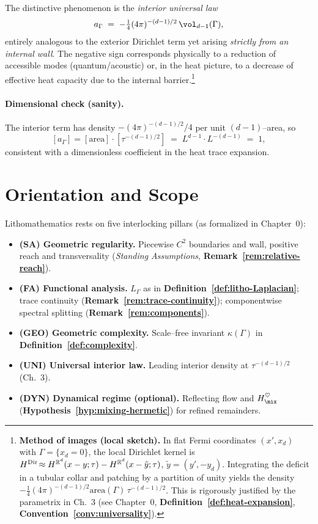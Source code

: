 \noindent The distinctive phenomenon is the \emph{interior universal law}
\[
a_\Gamma \;=\; -\tfrac14(4\pi)^{-(d-1)/2}\,\vol_{d-1}(\Gamma),
\]
entirely analogous to the exterior Dirichlet term yet arising \emph{strictly from an internal wall}.
The negative sign corresponds physically to a reduction of accessible modes (quantum/acoustic) or, in the heat picture, to a decrease of effective heat capacity due to the internal barrier.\footnote{\textbf{Method of images (local sketch).}
In flat Fermi coordinates $(x',x_d)$ with $\Gamma=\{x_d=0\}$, the local Dirichlet kernel is
$H^{\rm Dir}\!\approx H^{\mathbb{R}^d}(x-y;\tau)-H^{\mathbb{R}^d}(x-\tilde y;\tau)$, $\tilde y=(y',-y_d)$.
Integrating the deficit in a tubular collar and patching by a partition of unity yields the density $-\frac14(4\pi)^{-(d-1)/2}\mathrm{area}(\Gamma)\,\tau^{-(d-1)/2}$.
This is rigorously justified by the parametrix in Ch.~3 (see Chapter~0, \textbf{Definition~\ref{def:heat-expansion}}, \textbf{Convention~\ref{conv:universality}}).}

\paragraph{Dimensional check (sanity).}
The interior term has density $-(4\pi)^{-(d-1)/2}/4$ per unit $(d\!-\!1)$–area, so
\[
[a_\Gamma]=[\mathrm{area}]\cdot[\tau^{-(d-1)/2}] \;=\; L^{d-1}\cdot L^{-(d-1)} \;=\; 1,
\]
consistent with a dimensionless coefficient in the heat trace expansion.

\medskip

\section{Orientation and Scope}\label{sec:orientation}

Lithomathematics rests on five interlocking pillars (as formalized in Chapter~0):

\begin{itemize}
  \item \textbf{(SA) Geometric regularity.} Piecewise $C^2$ boundaries and wall, positive reach and transversality (\emph{Standing Assumptions}, \textbf{Remark~\ref{rem:relative-reach}}).
  \item \textbf{(FA) Functional analysis.} $L_\Gamma$ as in \textbf{Definition~\ref{def:litho-Laplacian}}; trace continuity (\textbf{Remark~\ref{rem:trace-continuity}}); componentwise spectral splitting (\textbf{Remark~\ref{rem:components}}).
  \item \textbf{(GEO) Geometric complexity.} Scale–free invariant $\kappa(\Gamma)$ in \textbf{Definition~\ref{def:complexity}}.
  \item \textbf{(UNI) Universal interior law.} Leading interior density at $\tau^{-(d-1)/2}$ (Ch.~3).
  \item \textbf{(DYN) Dynamical regime (optional).} Reflecting flow and $H_{\mix}^{\heartsuit}$ (\textbf{Hypothesis~\ref{hyp:mixing-hermetic}}) for refined remainders.
\end{itemize}

